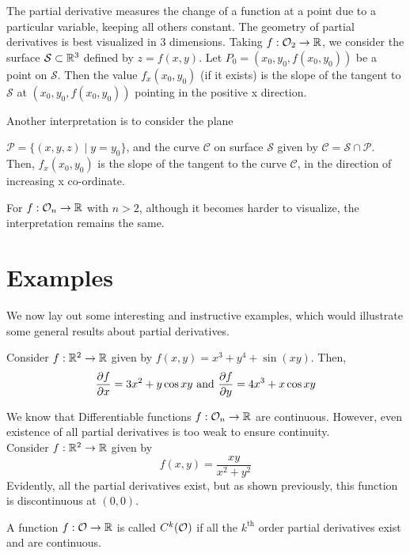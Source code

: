\documentclass[../Analysis-3.tex]{subfiles}
\begin{document}
The partial derivative measures the change of a function at a point due to a particular variable, keeping all others constant. The geometry of partial derivatives is best visualized in 3 dimensions. Taking $f: \mathcal{O}_{2} \to \mathbb{R}$, we consider the surface $\mathcal{S} \subset \mathbb{R}^3$ defined by $z = f(x,y)$. Let $P_0 = (x_0, y_0, f(x_0, y_0))$ be a point on $\mathcal{S}$. Then the value $f_x(x_0, y_0)$ (if it exists) is the slope of the tangent to $\mathcal{S}$ at $(x_0, y_0, f(x_0, y_0))$ pointing in the positive x direction.

Another interpretation is to consider the plane

$\mathcal{P} = \{(x,y,z) \mid y = y_0\}$, and the curve $\mathcal{C}$ on surface $\mathcal{S}$ given by $\mathcal{C} = \mathcal{S} \cap \mathcal{P}$. Then, $f_x(x_0, y_0)$ is the slope of the tangent to the curve $\mathcal{C}$, in the direction of increasing x co-ordinate.

For $f: \mathcal{O}_{n} \to \mathbb{R}$ with $n > 2$, although it becomes harder to visualize, the interpretation remains the same.

\newpage

\section{Examples}

We now lay out some interesting and instructive examples, which would illustrate some general results about partial derivatives.

\begin{Eg}{}{}
  Consider $f: \mathbb{R}^2 \to \mathbb{R}$ given by $f(x,y) = x^3 + y^4 + \sin(xy)$. Then,
  $$\pdv{f}{x} = 3x^2 + y\cos{xy} \text{ and } \pdv{f}{y} = 4x^3 + x\cos{xy}$$
\end{Eg}

\begin{Eg}{}{}
  We know that Differentiable functions  $f: \mathcal{O}_{n} \to \mathbb{R}$ are continuous. However, even existence of all partial derivatives is too weak to ensure continuity.\\
  Consider $f: \mathbb{R}^2 \to \mathbb{R}$ given by
  $$f(x,y) = \frac{xy}{x^2 + y^2}$$
  Evidently, all the partial derivatives exist, but as shown previously, this function is discontinuous at $(0,0)$.
\end{Eg}

\begin{Def}{}{}
  A function $f: \mathcal{O}_{} \to \mathbb{R}$ is called $C^k(\mathcal{O}_{})$ if all the \( {k}^{\text{th}} \) order partial derivatives exist and are continuous.
\end{Def}
\end{document}
